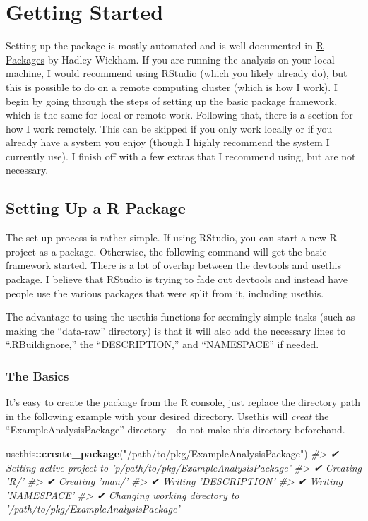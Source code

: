 \documentclass[]{book}
\newenvironment{Shaded}{\begin{snugshade}}{\end{snugshade}}
\newcommand{\KeywordTok}[1]{\textcolor[rgb]{0.13,0.29,0.53}{\textbf{#1}}}
\newcommand{\StringTok}[1]{\textcolor[rgb]{0.31,0.60,0.02}{#1}}
\newcommand{\CommentTok}[1]{\textcolor[rgb]{0.56,0.35,0.01}{\textit{#1}}}
\newcommand{\OperatorTok}[1]{\textcolor[rgb]{0.81,0.36,0.00}{\textbf{#1}}}
\newcommand{\NormalTok}[1]{#1}
\begin{document}
\chapter{Getting Started}\label{getting-started}

Setting up the package is mostly automated and is well documented in
\href{https://r-pkgs.org/index.html}{R Packages} by Hadley Wickham. If
you are running the analysis on your local machine, I would recommend
using \href{https://www.rstudio.com}{RStudio} (which you likely already
do), but this is possible to do on a remote computing cluster (which is
how I work). I begin by going through the steps of setting up the basic
package framework, which is the same for local or remote work. Following
that, there is a section for how I work remotely. This can be skipped if
you only work locally or if you already have a system you enjoy (though
I highly recommend the system I currently use). I finish off with a few
extras that I recommend using, but are not necessary.

\section{Setting Up a R Package}\label{setting-up-a-r-package}

The set up process is rather simple. If using RStudio, you can start a
new R project as a package. Otherwise, the following command will get
the basic framework started. There is a lot of overlap between the
devtools and usethis package. I believe that RStudio is trying to fade
out devtools and instead have people use the various packages that were
split from it, including usethis.

The advantage to using the usethis functions for seemingly simple tasks
(such as making the ``data-raw'' directory) is that it will also add the
necessary lines to ``.RBuildignore,'' the ``DESCRIPTION,'' and
``NAMESPACE'' if needed.

\subsection{The Basics}\label{the-basics}

It's easy to create the package from the R console, just replace the
directory path in the following example with your desired directory.
Usethis will \emph{creat} the ``ExampleAnalysisPackage'' directory - do
not make this directory beforehand.

\begin{Shaded}
\begin{Highlighting}[]
\NormalTok{usethis}\OperatorTok{::}\KeywordTok{create_package}\NormalTok{(}\StringTok{"/path/to/pkg/ExampleAnalysisPackage"}\NormalTok{)}
\CommentTok{#> ✔ Setting active project to 'p/path/to/pkg/ExampleAnalysisPackage'}
\CommentTok{#> ✔ Creating 'R/'}
\CommentTok{#> ✔ Creating 'man/'}
\CommentTok{#> ✔ Writing 'DESCRIPTION'}
\CommentTok{#> ✔ Writing 'NAMESPACE'}
\CommentTok{#> ✔ Changing working directory to '/path/to/pkg/ExampleAnalysisPackage'}
\end{Highlighting}
\end{Shaded}
\end{document}
